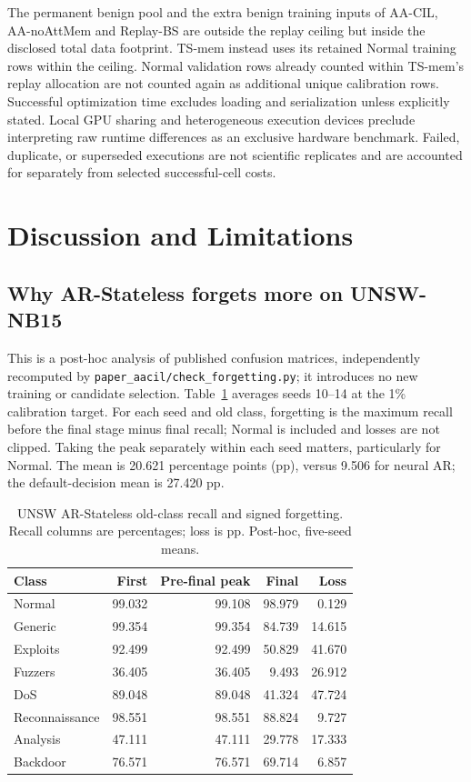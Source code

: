 \documentclass[10pt,twocolumn]{article}
\begin{document}
The permanent benign pool and the extra benign training inputs of AA-CIL, AA-noAttMem and Replay-BS are outside the replay ceiling but inside the disclosed total data footprint. TS-mem instead uses its retained Normal training rows within the ceiling. Normal validation rows already counted within TS-mem's replay allocation are not counted again as additional unique calibration rows. Successful optimization time excludes loading and serialization unless explicitly stated. Local GPU sharing and heterogeneous execution devices preclude interpreting raw runtime differences as an exclusive hardware benchmark. Failed, duplicate, or superseded executions are not scientific replicates and are accounted for separately from selected successful-cell costs.

\section{Discussion and Limitations}\label{sec:limitations}
\subsection{Why AR-Stateless forgets more on UNSW-NB15}
This is a post-hoc analysis of published confusion matrices, independently recomputed by \texttt{paper\_aacil/check\_forgetting.py}; it introduces no new training or candidate selection. Table~\ref{tab:forgetting-decomposition} averages seeds 10--14 at the 1\% calibration target. For each seed and old class, forgetting is the maximum recall before the final stage minus final recall; Normal is included and losses are not clipped. Taking the peak separately within each seed matters, particularly for Normal. The mean is 20.621 percentage points (pp), versus 9.506 for neural AR; the default-decision mean is 27.420 pp.

\begin{table}[htbp]
\centering\small
\caption{UNSW AR-Stateless old-class recall and signed forgetting. Recall columns are percentages; loss is pp. Post-hoc, five-seed means.}
\label{tab:forgetting-decomposition}
\scriptsize\setlength{\tabcolsep}{3pt}
\begin{tabular}{lrrrr}\toprule
Class & First & Pre-final peak & Final & Loss\\\midrule
Normal &99.032&99.108&98.979&0.129\\
Generic &99.354&99.354&84.739&14.615\\
Exploits &92.499&92.499&50.829&41.670\\
Fuzzers &36.405&36.405&9.493&26.912\\
DoS &89.048&89.048&41.324&47.724\\
Reconnaissance &98.551&98.551&88.824&9.727\\
Analysis &47.111&47.111&29.778&17.333\\
Backdoor &76.571&76.571&69.714&6.857\\\bottomrule
\end{tabular}
\end{table}
\end{document}

